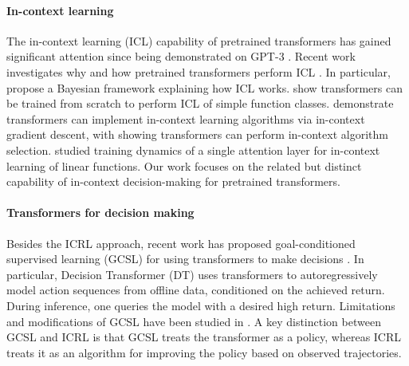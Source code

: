 \documentclass[10pt]{article}
\newcommand{\<}{\left\langle}
\renewcommand{\>}{\right\rangle}
\begin{document}
\paragraph{In-context learning}
The in-context learning (ICL) capability of pretrained transformers has gained significant attention since being demonstrated on GPT-3 \cite{brown2020language}. Recent work investigates why and how pretrained transformers perform ICL \citep{garg2022can, li2023transformers, von2023transformers, akyurek2022learning, xie2021explanation, bai2023transformers,
zhang2023trained, ahn2023transformers, raventos2023pretraining}. In particular, \cite{xie2021explanation} propose a Bayesian framework explaining how ICL works. \cite{garg2022can} show transformers can be trained from scratch to perform ICL of simple function classes.  \cite{von2023transformers, akyurek2022learning, bai2023transformers} demonstrate transformers can implement in-context learning algorithms via in-context gradient descent, with \cite{bai2023transformers} showing transformers can perform in-context algorithm selection. \cite{zhang2023trained} studied training dynamics of a single attention layer for in-context learning of linear functions. Our work focuses on the related but distinct capability of in-context decision-making for pretrained transformers.
\paragraph{Transformers for decision making} Besides the ICRL approach, recent work has proposed goal-conditioned supervised learning (GCSL) for using transformers to make decisions \citep{chen2021decision, janner2021offline, lee2022multi, reed2022generalist, brohan2022rt, shafiullah2022behavior, yang2023foundation}. In particular, Decision Transformer (DT) \citep{chen2021decision, janner2021offline} uses transformers to autoregressively model action sequences from offline data, conditioned on the achieved return. During inference, one queries the model with a desired high return. Limitations and modifications of GCSL have been studied in \cite{yang2022dichotomy, paster2022you, vstrupl2022upside, brandfonbrener2022does}. A key distinction between GCSL and ICRL is that GCSL treats the transformer as a policy, whereas ICRL treats it as an algorithm for improving the policy based on observed trajectories.
\end{document}
